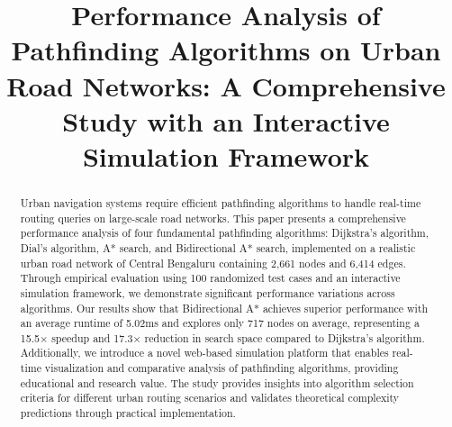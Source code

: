 \documentclass[conference]{IEEEtran}
\begin{document}
\title{Performance Analysis of Pathfinding Algorithms on Urban Road Networks: A Comprehensive Study with an Interactive Simulation Framework}

\author{
  \and
  \and
}

\maketitle

\begin{abstract}
Urban navigation systems require efficient pathfinding algorithms to handle real-time routing queries on large-scale road networks. This paper presents a comprehensive performance analysis of four fundamental pathfinding algorithms: Dijkstra's algorithm, Dial's algorithm, A* search, and Bidirectional A* search, implemented on a realistic urban road network of Central Bengaluru containing 2,661 nodes and 6,414 edges. Through empirical evaluation using 100 randomized test cases and an interactive simulation framework, we demonstrate significant performance variations across algorithms. Our results show that Bidirectional A* achieves superior performance with an average runtime of 5.02ms and explores only 717 nodes on average, representing a 15.5× speedup and 17.3× reduction in search space compared to Dijkstra's algorithm. Additionally, we introduce a novel web-based simulation platform that enables real-time visualization and comparative analysis of pathfinding algorithms, providing educational and research value. The study provides insights into algorithm selection criteria for different urban routing scenarios and validates theoretical complexity predictions through practical implementation.
\end{abstract}
\end{document}
